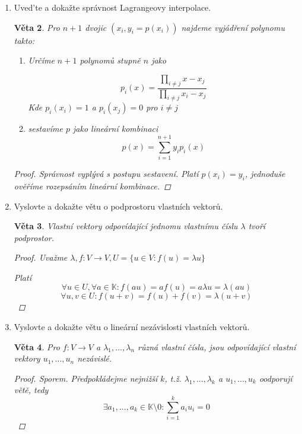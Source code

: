 \documentclass[10pt,a4paper]{article}
\theoremstyle{plain}
\newtheorem{veta}{Věta}
\begin{document}
\begin{enumerate}
\begin{veta}
\begin{proof}
\[ \det(V_{n+1}) = \prod^n_{i=1} (x_i - x_0) \det(V_n) \]

Tento rekurentní vztah dává

\[ \det(V_{n+1}) = \prod^n_{i < j} (x_j - x_i) \]

Tento výraz je nenulový, pokud žádný součinitel není nulový.

\end{proof}
\end{veta}

\item Uved'te a dokažte správnost Lagrangeovy interpolace.
\begin{veta}

Pro $n+1$ dvojic $(x_i, y_i=p(x_i))$ najdeme vyjádření polynomu takto:

\begin{enumerate}
\item Určíme $n+1$ polynomů stupně $n$ jako

\[ p_i(x) = \frac{\prod_{i \neq j} x - x_j}{\prod_{i \neq j} x_i - x_j}\]
Kde $p_i(x_i) = 1$ a $p_i(x_j) = 0$  pro $i \neq j$
\item sestavíme $p$ jako lineární kombinaci
\[ p(x) = \sum^{n+1}_{i=1} y_ip_i(x) \]
\end{enumerate}

\begin{proof}
Správnost vyplývá s postupu sestavení. Platí $p(x_i) = y_i$, jednoduše ověříme rozepsáním lineární kombinace.
\end{proof}
\end{veta}

\item Vyslovte a dokažte větu o podprostoru vlastních vektorů.
\begin{veta}
Vlastní vektory odpovídající jednomu vlastnímu číslu $\lambda$ tvoří podprostor.
\begin{proof} Uvažme $\lambda, f: V \to V, U = \{u \in V: f(u) = \lambda u\}$

Platí \[ \forall u \in U, \forall a \in \mathbb{K}: f(au) = af(u) = a \lambda u = \lambda(au)  \]
\[ \forall u,v \in U: f(u+v) = f(u) + f(v) = \lambda (u + v) \]
\end{proof}
\end{veta}

\item Vyslovte a dokažte větu o lineární nezávislosti vlastních vektorů.
\begin{veta}
Pro $f: V \to V$ a $\lambda_1, ..., \lambda_n$ různá vlastní čísla, jsou  odpovídající vlastní vektory $u_1, ..., u_n$ nezávislé.
\begin{proof} Sporem.
Předpokládejme nejnižší $k$, t.ž. $\lambda_1, ..., \lambda_k$ a $u_1, ..., u_k$ oodporují větě, tedy
\[ \exists a_1, ..., a_k \in \mathbb{K} \setminus 0: \sum^k_{i=1} a_i u_i = 0 \]


\end{proof}
\end{veta}
\end{enumerate}
\end{document}
